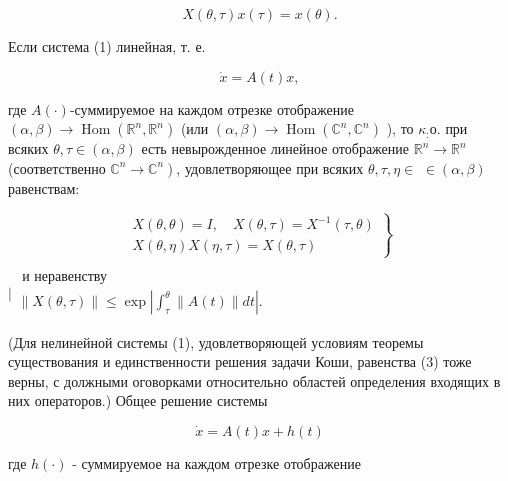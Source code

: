 \documentclass[10pt]{article}
\begin{document}
\[

X(\theta, \tau) x(\tau)=x(\theta) .

\]



Если система (1) линейная, т. е.



\[

\dot{x}=A(t) x,

\]



где $A(\cdot)$-суммируемое на каждом отрезке отображение $(\alpha, \beta) \longrightarrow \operatorname{Hom}\left(\mathbb{R}^{n}, \mathbb{R}^{n}\right)$ (или $(\alpha, \beta) \longrightarrow \operatorname{Hom}\left(\mathbb{C}^{n}, \mathbb{C}^{n}\right)$ ), то $\kappa_{:}$о. при всяких $\theta, \tau \in(\alpha, \beta)$ есть невырожденное линейное отображение $\mathbb{R}^{n} \rightarrow \mathbb{R}^{n}$ (соответственно $\left.\mathbb{C}^{n} \rightarrow \mathbb{C}^{n}\right)$, удовлетворяющее при всяких $\theta, \tau, \eta \in$ $\in(\alpha, \beta)$ равенствам:



\[

\left.\begin{array}{c}

X(\theta, \theta)=I, \quad X(\theta, \tau)=X^{-1}(\tau, \theta) \\

X(\theta, \eta) X(\eta, \tau)=X(\theta, \tau)

\end{array}\right\}

\]



$\mid \begin{gathered}\text { и неравенству } \\ \|X(\theta, \tau)\| \leqslant \exp \left|\int_{\tau}^{\theta}\|A(t)\| d t\right| .\end{gathered}$



(Для нелинейной системы (1), удовлетворяющей условиям теоремы существования и единственности решения задачи Коши, равенства (3) тоже верны, с должными оговорками относительно областей определения входящих в них операторов.) Общее решение системы



\[

\dot{x}=A(t) x+h(t)

\]



где $h(\cdot)$ - суммируемое на каждом отрезке отображение
\end{document}
